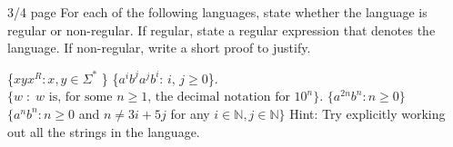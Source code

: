 \documentclass[solution, letterpaper]{cs121}
\begin{document}


 {3/4 page}
For each of the following languages, state whether the language is regular or non-regular. If regular, state a regular expression that denotes the language. If non-regular, write a short proof to justify.

\subproblem \{$xyx^R : x, y \in \Sigma^*$ \}
\subproblem \{$a^ib^ja^jb^i$: $i$, $j\geq0$\}.
\subproblem
$\{w\;:\;\textrm{$w$ is, for some $n\geq 1$, the decimal notation
for $10^n$}\}$. 
\subproblem $\{a^{2n}b^{n}: n\geq 0\}$
\subproblem $\{a^nb^n : n \geq 0$ and $n \neq 3i+5j$ for any $i \in \mathbb{N}, j \in \mathbb{N} \}$ Hint: Try explicitly working out all the strings in the language.
\end{document}
